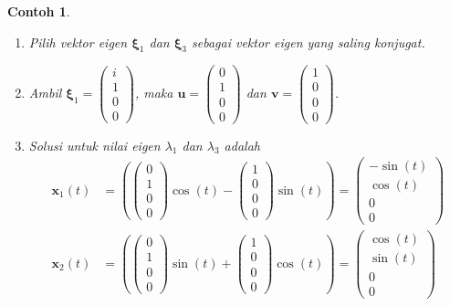 \documentclass[a4paper]{article}
\theoremstyle{definisi}
\newtheorem{contoh}{Contoh}[subsection]
\newcommand{\bfxi}{\boldsymbol{\xi}}
\numberwithin{equation}{section}
\begin{document}
\begin{contoh}
\begin{enumerate}[label=Langkah \arabic*: ,leftmargin=*]
      \item Pilih vektor eigen $\bfxi_1$ dan $\bfxi_3$ sebagai vektor eigen yang saling konjugat.
      \item Ambil $\bfxi_1 = \begin{pmatrix}i\\1\\0\\0\end{pmatrix}$, maka $\mathbf{u} = \begin{pmatrix}0\\1\\0\\0\end{pmatrix}$ dan $\mathbf{v} = \begin{pmatrix}1\\0\\0\\0\end{pmatrix}$.
      \item Solusi untuk nilai eigen $\lambda_1$ dan $\lambda_3$ adalah
      \begin{equation}\label{eq:contoh_pd_4_solusi_1}
        \begin{split}
          \mathbf{x}_1(t) &= \left(\begin{pmatrix}0\\1\\0\\0\end{pmatrix}\cos(t) - \begin{pmatrix}1\\0\\0\\0\end{pmatrix}\sin(t)\right) = \begin{pmatrix}-\sin(t)\\ \cos(t)\\0\\0\end{pmatrix}\\
          \mathbf{x}_2(t) &= \left(\begin{pmatrix}0\\1\\0\\0\end{pmatrix}\sin(t) + \begin{pmatrix}1\\0\\0\\0\end{pmatrix}\cos(t)\right) = \begin{pmatrix}\cos(t)\\ \sin(t)\\0\\0\end{pmatrix}

\end{split}
\end{equation}
\end{enumerate}
\end{contoh}
\end{document}
